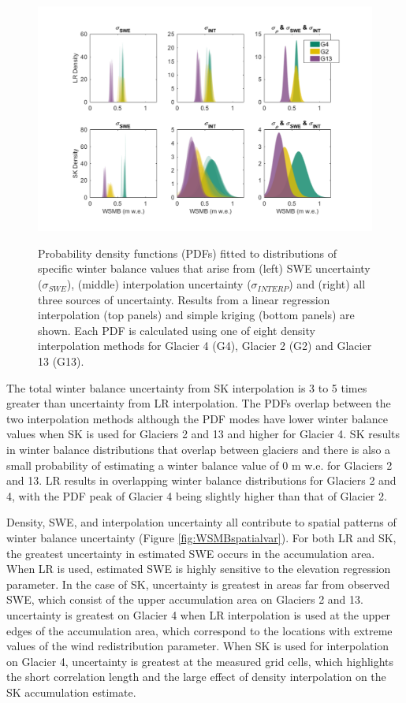 \documentclass[twocolumn, letterpaper]{igs}
\begin{document}
\begin{figure}
	\centering
\hspace*{-1.2cm}
	\includegraphics[width =1.2\textwidth]{WSMBDist.pdf}\\
	\caption{Probability density functions (PDFs) fitted to distributions of specific winter balance values that arise from (left) SWE uncertainty ($\sigma_{SWE}$), (middle) interpolation uncertainty ($\sigma_{INTERP}$) and (right) all three sources of uncertainty. Results from a linear regression interpolation (top panels) and simple kriging (bottom panels) are shown. Each PDF is calculated using one of eight density interpolation methods for Glacier 4 (G4), Glacier 2 (G2) and Glacier 13 (G13).}
	\label{fig:WSMBDist_LR}
\end{figure}

The total winter balance uncertainty from SK interpolation is 3 to 5 times greater than uncertainty from LR interpolation. The PDFs overlap between the two interpolation methods although the PDF modes have lower winter balance values when SK is used for Glaciers 2 and 13 and higher for Glacier 4. SK results in winter balance distributions that overlap between glaciers and there is also a small probability of estimating a winter balance value of 0 m w.e. for Glaciers 2 and 13. LR results in overlapping winter balance distributions for Glaciers 2 and 4, with the PDF peak of Glacier 4 being slightly higher than that of Glacier 2. 

Density, SWE, and interpolation uncertainty all contribute to spatial patterns of winter balance uncertainty (Figure \ref{fig:WSMBspatialvar}).  For both LR and SK, the greatest uncertainty in estimated SWE occurs in the accumulation area. When LR is used, estimated SWE is highly sensitive to the elevation regression parameter. In the case of SK, uncertainty is greatest in areas far from observed SWE, which consist of the upper accumulation area on Glaciers 2 and 13. uncertainty is greatest on Glacier 4 when LR interpolation is used at the upper edges of the accumulation area, which correspond to the locations with extreme values of the wind redistribution parameter. When SK is used for interpolation on Glacier 4, uncertainty is greatest at the measured grid cells, which highlights the short correlation length and the large effect of density interpolation on the SK accumulation estimate.
\end{document}
